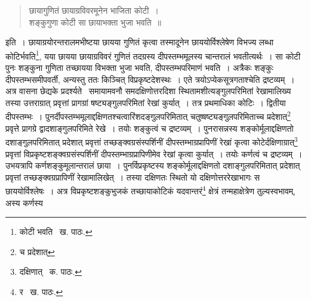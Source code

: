 \documentclass[11pt, openany]{book}
\begin{document}
\begin{quote}
{\qt छायागुणितं छायाग्रविवरमूनेन भाजिता कोटी~।\\
शङ्कुगुणा कोटी सा छायाभक्ता भुजा भवति~॥}
\end{quote}

\noindent इति~। छायाग्रयोरन्तरालमभीष्टया छायया गुणितं कृत्वा तस्मादूनेन छाययोर्विश्लेषेण विभज्य लब्धा कोटिर्भवति\renewcommand{\thefootnote}{१}\footnote{कोटी भवति \textendash\ ख. पाठः.}, यया छायया छायाग्रविवरं गुणितं तदग्रस्य दीपस्तम्भमूलस्य चान्तरालं भवतीत्यर्थः~। सा कोटी पुनः शङ्कुना गुणिता तच्छायया विभक्ता भुजा भवति, दीपस्तम्भपरिमाणं भवति~। अत्रैकः शङ्कुः दीपस्तम्भसमीपवर्ती, अन्यस्तु ततः किञ्चित् विप्रकृष्टदेशस्थः~। एते त्रयोऽप्येकसूत्रगताश्चेति द्रष्टव्यम्~।
अत्र वासना छेद्यके प्रदर्श्यते \textendash\ समायामवनौ समदक्षिणोत्तरदिशा स्थितामशीत्यङ्गुलपरिमितां रेखामालिख्य तस्या उत्तराग्रात् प्रवृत्तां प्रागग्रां षष्ट्यङ्गुलपरिमितां रेखां कुर्यात्~। तत्र प्रथमाधिका कोटिः~। द्वितीया दीपस्तम्भः~। पुनर्दीपस्तम्भमूलाद्दक्षिणतश्चत्वारिंशदङ्गुलपरिमितात्
चतुष्षष्ट्यङ्गुलपरिमिताच्च प्रदेशात्\renewcommand{\thefootnote}{२}\footnote{च प्रदेशात्} प्रवृत्ते प्रागग्रे द्वादशाङ्गुलपरिमिते रेखे~। तयोः शङ्कुत्वं च द्रष्टव्यम्~। पुनरासन्नस्य शङ्कोर्मूलाद्दक्षिणतो दशाङ्गुलपरिमितात् प्रदेशात् प्रवृत्तां तच्छङ्क्वग्रसंस्पर्शिनीं दीपस्तम्भाग्रप्रापिणीं रेखां कृत्वा कोटेर्दक्षिणाग्रात्\renewcommand{\thefootnote}{३}\footnote{दक्षिणात् \textendash\ क. पाठः.} प्रवृत्तां विप्रकृष्टशङ्क्वग्रसंस्पर्शिनीं दीपस्तम्भाग्रप्रापिणीमेव रेखां कृत्वा कुर्यात्~। तयोः कर्णत्वं च द्रष्टव्यम्~। उभयत्रापि कर्णशङ्कुमूलान्तरालं छाया~। पुनर्विप्रकृष्टस्य शङ्कोर्मूलाद्दक्षिणतो दशाङ्गुलपरिमितात् प्रदेशात् प्रवृत्तां तच्छङ्क्वग्रप्रापिणीं रेखामालिखेत्~। तस्या दक्षिणतः स्थितो यो दक्षिणोत्तररेखाभागः स छाययोर्विश्लेषः~। अत्र विप्रकृष्टशङ्कुभुजकं तच्छायाकोटिकं यदवान्तरं\renewcommand{\thefootnote}{४}\footnote{र \textendash\ ख. पाठः.} क्षेत्रं तन्महाक्षेत्रेण तुल्यस्वभावम्, अस्य कर्णस्य

\newpage
\end{document}
